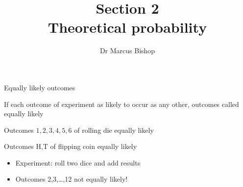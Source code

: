 \documentclass[handout]{beamer}
\title[\S2]{Section 2\\Theoretical probability}
\author{Dr Marcus Bishop}
\theoremstyle{definition}
\begin{document}
\begin{frame}\titlepage\end{frame}
\LogoOff

\begin{frame}{Equally likely outcomes}
\begin{definition} If each outcome of experiment
as likely to occur as any other, outcomes called
\alert{equally likely}
\end{definition}
\begin{example}
Outcomes $1,2,3,4,5,6$ of rolling die equally likely
\end{example}
\begin{example}
Outcomes H,T of flipping coin equally likely
\end{example}
\begin{example}
\begin{itemize}
\item Experiment: roll two dice and add results
\item Outcomes 2,3,\ldots,12 \alert{not} equally likely!
\end{itemize}
\end{example}
\end{frame}
\end{document}
